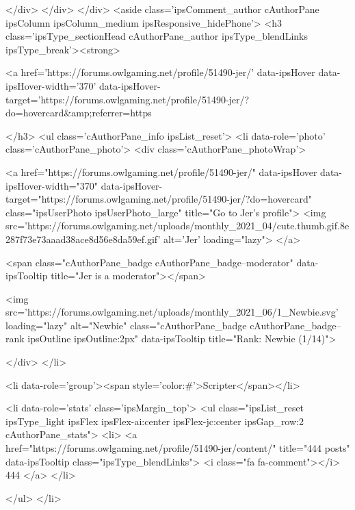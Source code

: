 			</div>
		</div>
	</div>
	<aside class='ipsComment_author cAuthorPane ipsColumn ipsColumn_medium ipsResponsive_hidePhone'>
		<h3 class='ipsType_sectionHead cAuthorPane_author ipsType_blendLinks ipsType_break'><strong>


<a href='https://forums.owlgaming.net/profile/51490-jer/' data-ipsHover data-ipsHover-width='370' data-ipsHover-target='https://forums.owlgaming.net/profile/51490-jer/?do=hovercard&amp;referrer=https%
			
		</h3>
		<ul class='cAuthorPane_info ipsList_reset'>
			<li data-role='photo' class='cAuthorPane_photo'>
				<div class='cAuthorPane_photoWrap'>
					


	<a href="https://forums.owlgaming.net/profile/51490-jer/" data-ipsHover data-ipsHover-width="370" data-ipsHover-target="https://forums.owlgaming.net/profile/51490-jer/?do=hovercard" class="ipsUserPhoto ipsUserPhoto_large" title="Go to Jer's profile">
		<img src='https://forums.owlgaming.net/uploads/monthly_2021_04/cute.thumb.gif.8e287f73e73aaad38ace8d56e8da59ef.gif' alt='Jer' loading="lazy">
	</a>

					
						<span class="cAuthorPane_badge cAuthorPane_badge--moderator" data-ipsTooltip title="Jer is a moderator"></span>
					
					
						
<img src='https://forums.owlgaming.net/uploads/monthly_2021_06/1_Newbie.svg' loading="lazy" alt="Newbie" class="cAuthorPane_badge cAuthorPane_badge--rank ipsOutline ipsOutline:2px" data-ipsTooltip title="Rank: Newbie (1/14)">
					
				</div>
			</li>
			
				<li data-role='group'><span style='color:#'>Scripter</span></li>
				
			
			
				<li data-role='stats' class='ipsMargin_top'>
					<ul class="ipsList_reset ipsType_light ipsFlex ipsFlex-ai:center ipsFlex-jc:center ipsGap_row:2 cAuthorPane_stats">
						<li>
							<a href="https://forums.owlgaming.net/profile/51490-jer/content/" title="444 posts" data-ipsTooltip class="ipsType_blendLinks">
								<i class="fa fa-comment"></i> 444
							</a>
						</li>
						
					</ul>
				</li>
			
			
				


